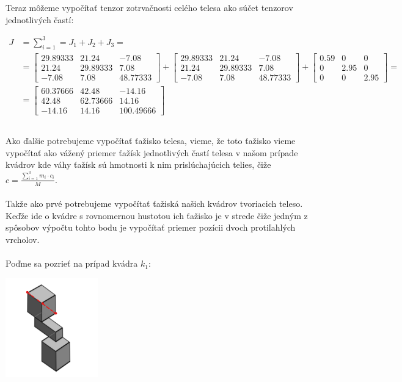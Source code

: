 \documentclass[a4paper]{article}
\begin{document}
	Teraz môžeme vypočítať tenzor zotrvačnosti celého telesa ako súčet tenzorov jednotlivých častí:
	
	\begin{align*}
		J &= \sum_{i=1}^{3} = J_1 + J_2 + J_3 =
		\\
		&=
		\begin{bmatrix}
			29.89333 & 21.24 &  -7.08 \\
			21.24 & 29.89333 & 7.08 \\
			-7.08 & 7.08 & 48.77333
		\end{bmatrix} +
		\begin{bmatrix}
			29.89333 & 21.24 &  -7.08 \\
			21.24 & 29.89333 & 7.08 \\
			-7.08 & 7.08 & 48.77333
		\end{bmatrix} +
		\begin{bmatrix}
			0.59 & 0 & 0 \\
			0 & 2.95 & 0 \\
			0 & 0 & 2.95
		\end{bmatrix} =
		\\
		&=
		\begin{bmatrix}
			60.37666 & 42.48 &  -14.16 \\
			42.48 & 62.73666 & 14.16 \\
			-14.16 & 14.16 & 100.49666
		\end{bmatrix}
	\end{align*}
	
	\subsection{}
	
	Ako ďalšie potrebujeme vypočítať ťažisko telesa, vieme, že toto ťažisko vieme vypočítať ako vážený priemer ťažísk jednotlivých častí telesa v našom prípade kvádrov kde váhy ťažísk sú hmotnosti k nim prislúchajúcich telies, čiže $c = \frac{\sum_{i=1}^{3} m_i \cdot c_i}{M}$.
	\\
	\\
	Takže ako prvé potrebujeme vypočítať ťažiská našich kvádrov tvoriacich teleso. Keďže ide o kvádre s rovnomernou hustotou ich ťažisko je v strede čiže jedným z spôsobov výpočtu tohto bodu je vypočítať priemer pozícii dvoch protiľahlých vrcholov.
	\\
	\\
	Poďme sa pozrieť na prípad kvádra $k_1$:
	
	\centerline{\includegraphics[width=0.3\textwidth]{taz_k_1}} 
	
\end{document}
